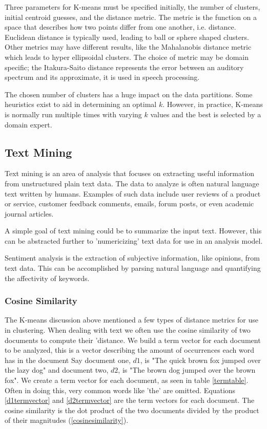 \documentclass[12pt]{article}
\begin{document}
\begin{doublespacing}
Three parameters for K-means must be specified initially, the number of clusters, initial centroid guesses, and the distance metric.
The metric is the function on a space that describes how two points differ from one another, i.e. distance.
Euclidean distance is typically used, leading to ball or sphere shaped clusters. \citep{Jain2010651}
Other metrics may have different results, like the Mahalanobis distance metric which leads to hyper ellipsoidal clusters. \citep{MaoJain1996}
The choice of metric may be domain specific; the Itakura-Saito distance represents the error between an auditory spectrum and its approximate, it is used in speech processing. \citep{chan2008advances}

The chosen number of clusters has a huge impact on the data partitions.
Some heuristics exist to aid in determining an optimal $k$. \citep{tibshirani2001estimating}
However, in practice, K-means is normally run multiple times with varying $k$ values and the best is selected by a domain expert.


\subsection{Text Mining}
Text mining is an area of analysis that focuses on extracting useful information from unstructured plain text data.
The data to analyze is often natural language text written by humans.
Examples of such data include user reviews of a product or service, customer feedback comments, emails, forum posts, or even academic journal articles.

A simple goal of text mining could be to summarize the input text.
However, this can be abstracted further to 'numericizing' text data for use in an analysis model.

Sentiment analysis is the extraction of subjective information, like opinions, from text data.
This can be accomplished by parsing natural language and quantifying the affectivity of keywords.

\subsubsection{Cosine Similarity}
The K-means discussion above mentioned a few types of distance metrics for use in clustering.
When dealing with text we often use the cosine similarity of two documents to compute their 'distance.
We build a term vector for each document to be analyzed, this is a vector describing the amount of occurrences each word has in the document
Say document one, $d1$, is "The quick brown fox jumped over the lazy dog" and document two, $d2$, is "The brown dog jumped over the brown fox".
We create a term vector for each document, as seen in table \ref{termtable}. 
Often in doing this, very common words like 'the' are omitted.
Equations \ref{d1termvector} and \ref{d2termvector} are the term vectors for each document.
The cosine similarity is the dot product of the two documents divided by the product of their magnitudes (\ref{cosinesimilarity}). \citep{huang2008similarity}


\end{doublespacing}
\end{document}
